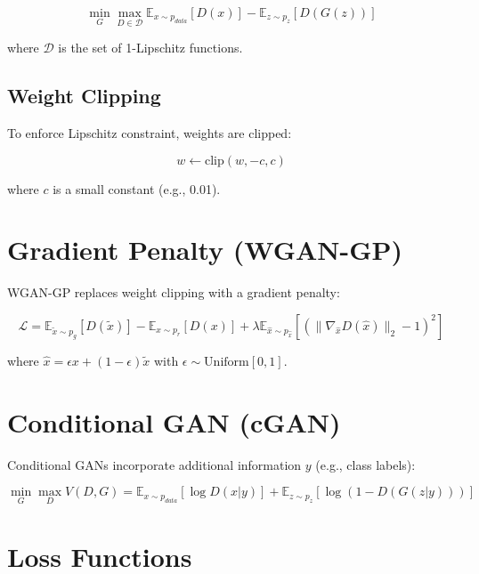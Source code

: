 \documentclass[12pt,a4paper]{article}
\begin{document}
\begin{equation}
\min_G \max_{D \in \mathcal{D}} \mathbb{E}_{x \sim p_{data}}[D(x)] - \mathbb{E}_{z \sim p_z}[D(G(z))]
\end{equation}

where $\mathcal{D}$ is the set of 1-Lipschitz functions.

\subsection{Weight Clipping}

To enforce Lipschitz constraint, weights are clipped:

\begin{equation}
w \leftarrow \text{clip}(w, -c, c)
\end{equation}

where $c$ is a small constant (e.g., 0.01).

\section{Gradient Penalty (WGAN-GP)}

WGAN-GP replaces weight clipping with a gradient penalty:

\begin{equation}
\mathcal{L} = \mathbb{E}_{\tilde{x} \sim p_g}[D(\tilde{x})] - \mathbb{E}_{x \sim p_r}[D(x)] + \lambda \mathbb{E}_{\hat{x} \sim p_{\hat{x}}}[(\|\nabla_{\hat{x}} D(\hat{x})\|_2 - 1)^2]
\end{equation}

where $\hat{x} = \epsilon x + (1 - \epsilon)\tilde{x}$ with $\epsilon \sim \text{Uniform}[0, 1]$.

\section{Conditional GAN (cGAN)}

Conditional GANs incorporate additional information $y$ (e.g., class labels):

\begin{equation}
\min_G \max_D V(D, G) = \mathbb{E}_{x \sim p_{data}}[\log D(x | y)] + \mathbb{E}_{z \sim p_z}[\log(1 - D(G(z | y)))]
\end{equation}

\section{Loss Functions}
\end{document}
